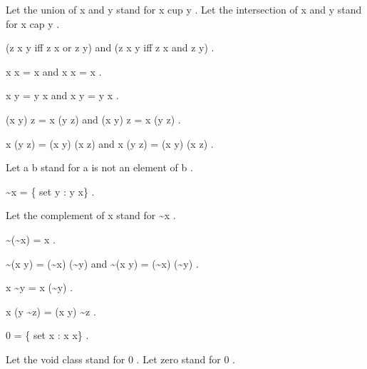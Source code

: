 \documentclass[a4paper,draft]{amsproc}
\begin{document}
\begin{forthel}
Let the union of  x  and  y  stand for  x cup y .
Let the intersection of  x  and  y  stand for  x cap y .

\begin{theorem}
 (z \in x \cup y  iff  z \in x  or  z \in y) 
and  (z \in x \cap y  iff  z \in x  and  z \in y) .
\end{theorem}

\begin{theorem}
 x \cup x = x  and  x \cap x = x .
\end{theorem}

\begin{theorem}
 x \cup y = y \cup x  and  x \cap y = y \cap x .
\end{theorem}

\begin{theorem}
 (x \cup y) \cup z = x \cup (y \cup z)  
and  (x \cap y) \cap z = x \cap (y \cap z) .
\end{theorem}

\begin{theorem}
 x \cap (y \cup z) = (x \cap y) \cup (x \cap z) 
and  x \cup (y \cap z) = (x \cup y) \cap (x \cup z) .
\end{theorem}

Let  a \notin b  stand for  a  is not an element of  b .

\begin{definition}  \sim x = \{ set  y : y \notin x\} .\end{definition}
Let the complement of  x  stand for  \sim x .

\begin{theorem}
 \sim (\sim x) = x .
\end{theorem}

\begin{theorem}
 \sim (x \cup y) = (\sim x) \cap (\sim y)  
and  \sim (x \cap y) = (\sim x) \cup (\sim y) .
\end{theorem}

\begin{definition}  x \sim y = x \cap (\sim y) .\end{definition}

\begin{theorem}
 x \cap (y \sim z) = (x \cap y) \sim z .
\end{theorem}

\begin{definition}  0 = \{ set  x : x \neq x\} .\end{definition}
Let the void class stand for  0 .
Let zero stand for  0 .


\end{forthel}
\end{document}

